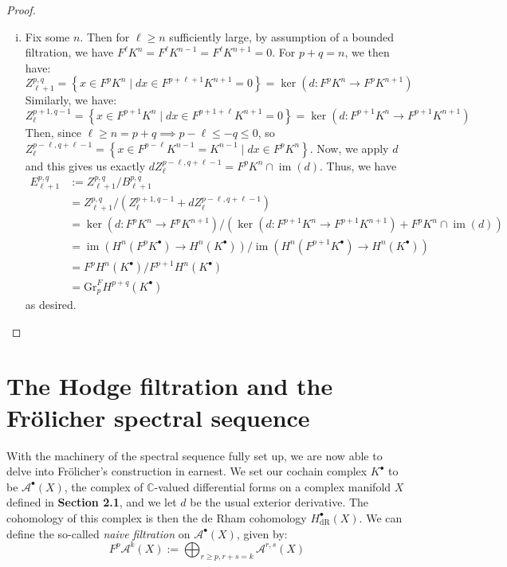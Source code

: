 \documentclass[11pt]{article}
\newcommand{\C}{\mathbb{C}}
\newcommand{\image}{\operatorname{im}}
\theoremstyle{definition}
\numberwithin{theorem}{section} %
\numberwithin{equation}{section} %
\begin{document}
\begin{proof}
\begin{enumerate}[i.]
        \item Fix some $n$. Then for $\ell\geq n$ sufficiently large, by assumption of a bounded filtration, we have $F^\ell K^n = F^\ell K^{n-1} = F^\ell K^{n+1} =0$. For $p+q=n$, we then have:
        $$
        Z_{\ell+1}^{p,q} =\left\{x\in F^p K^n \mid dx\in F^{p+\ell+1} K^{n+1} = 0\right\}= \ker \left(d:F^pK^n\to F^pK^{n+1}\right)
        $$
        Similarly, we have:
        $$
        Z_{\ell}^{p+1,q-1} = \left\{x\in F^{p+1}K^n\mid dx\in F^{p+1+\ell} K^{n+1}=0\right\} = \ker \left(d:F^{p+1}K^n\to F^{p+1}K^{n+1}\right)
        $$
        Then, since $\ell \geq n=p+q \implies p-\ell \leq -q \leq 0$, so $Z_\ell^{p-\ell,q+\ell-1} = \left\{x\in F^{p-\ell}K^{n-1} =K^{n-1}\mid dx\in F^p K^{n}\right\}$. Now, we apply $d$ and this gives us exactly $dZ_\ell^{p-\ell,q+\ell-1}=F^pK^n\cap \image (d)$. Thus, we have
        \begin{align*}
        E_{\ell+1}^{p,q} &:= Z_{\ell+1}^{p,q} /B_{\ell+1}^{p,q} \\
        &= Z_{\ell+1}^{p,q} /\left(Z_{\ell}^{p+1,q-1} + dZ_{\ell}^{p-\ell,q+\ell-1}\right) \\
        &= \ker \left(d:F^pK^n\to F^pK^{n+1}\right) / \left(\ker \left(d:F^{p+1}K^n\to F^{p+1}K^{n+1}\right) +F^pK^n\cap \image (d)\right) \\
        &= \image \left(H^n\left(F^pK^\bullet\right)\to H^n\left(K^\bullet\right)\right)/\image \left(H^n\left(F^{p+1}K^\bullet\right)\to H^n\left(K^\bullet\right)\right) \\
        &= F^pH^n\left(K^\bullet\right) / F^{p+1}H^n\left(K^\bullet\right) \\
        &= \mathrm{Gr}_p^FH^{p+q}\left(K^\bullet\right)
        \end{align*}
        as desired.
    \end{enumerate}
\end{proof}

\section{The Hodge filtration and the Fr\"olicher spectral sequence}
With the machinery of the spectral sequence fully set up, we are now able to delve into Fr\"olicher's construction in earnest. We set our cochain complex $K^\bullet$ to be $\mathcal{A}^\bullet(X)$, the complex of $\C$-valued differential forms on a complex manifold $X$ defined in \textbf{Section 2.1}, and we let $d$ be the usual exterior derivative. The cohomology of this complex is then the de Rham cohomology $H^\bullet_\mathrm{dR}(X)$. We can define the so-called \emph{naive filtration} on $\mathcal{A}^\bullet(X)$, given by:
$$
F^p\mathcal{A}^k(X) :=\bigoplus_{r\geq p, r+s=k} \mathcal{A}^{r,s}(X)
$$
\end{document}
